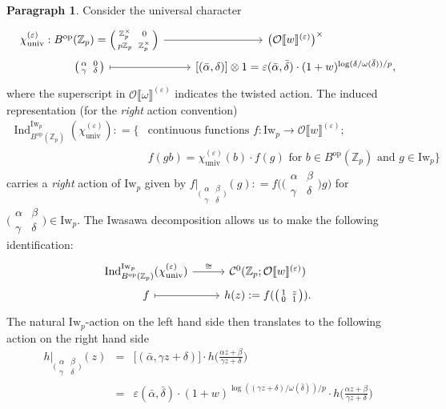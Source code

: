 \documentclass[12pt]{amsart}
\theoremstyle{definition}
\newtheorem{para}[subsection]{Paragraph}
\numberwithin{equation}{subsection}
\def\calC{\mathcal{C}}
\def\calO{\mathcal{O}}
\def\ZZ{\mathbb{Z}}
\newcommand{\op}{\mathrm{op}}
\newcommand{\Iw}{\mathrm{Iw}}
\newcommand{\univ}{\mathrm{univ}}
\DeclareMathOperator{\Ind}{Ind}
\newcommand{\Matrix}[4]{{\big(\begin{smallmatrix}#1&#2\\#3& #4\end{smallmatrix} \big)}}
\begin{document}
\begin{para}
\label{P:para_061}
Consider the universal character
\[
\begin{tikzcd}[row sep = 0pt]
\chi^{(\varepsilon)}_\univ: B^\mathrm{op}(\ZZ_p) ={\Big( \begin{smallmatrix}
\ZZ_p^\times &0  \\p\ZZ_p & \ZZ_p^\times
\end{smallmatrix} \Big)} \ar[r]
&\big( \calO\llbracket w \rrbracket^{(\varepsilon)} \big) ^\times
\\
{\Matrix {\alpha}{0}{\gamma}{\delta}} \ar[r, mapsto] & {[(\bar \alpha, \delta)]} \otimes 1 = \varepsilon(\bar \alpha, \bar \delta) \cdot (1+w)^{\log(\delta/\omega( \bar \delta))/p},
\end{tikzcd}
\]
where the superscript in $\calO\llbracket \omega\rrbracket^{(\varepsilon)}$ indicates the twisted action. The induced representation (for the \emph{right} action convention)
\begin{align*}
\Ind_{B^\op(\ZZ_p)}^{\Iw_p}(\chi_\univ^{(\varepsilon)}): = \big\{ &\textrm{continuous functions }f: \Iw_p \to  \calO\llbracket w\rrbracket^{(\varepsilon)};
\\ & f(gb) = \chi_\univ^{(\varepsilon)}(b) \cdot f(g) \textrm{ for }b \in B^\op(\ZZ_p) \textrm{ and } g \in \Iw_p\big\}
\end{align*}
carries a \emph{right} action of $\Iw_p$ given by $f|_{\Matrix \alpha\beta{\gamma}\delta}(g): = f\big(\Matrix \alpha \beta \gamma \delta g\big)$ 
for $\Matrix \alpha\beta{\gamma}\delta \in \Iw_p$.
The Iwasawa decomposition allows us to make the following identification:
\[
\begin{tikzcd}[row sep =0pt]
\Ind_{B^\op(\ZZ_p)}^{\Iw_p}(\chi_\univ^{(\varepsilon)}) \ar[r, "\cong"]& \calC^0(\ZZ_p; \calO\llbracket w \rrbracket^{(\varepsilon)})
\\
f \ar[r, mapsto] & h(z): = f(\Matrix 1{z}01).
\end{tikzcd}
\] 
The natural $\Iw_p$-action on the left hand side then translates to the following action on the right hand side
\begin{eqnarray}
\label{E:induced representation action}
h\big|_{\Matrix \alpha\beta{\gamma}\delta}(z) & =& \big[(\bar \alpha, \gamma z+\delta)\big] \cdot h\Big( \frac{\alpha z+\beta}{\gamma z+\delta}\Big)
\\
\nonumber
&=& \varepsilon(\bar \alpha, \bar \delta) \cdot (1+w)^{\log\left((\gamma z+\delta )/ \omega(\bar \delta)\right) / p} \cdot h\Big( \frac{\alpha z+\beta}{\gamma z+\delta}\Big)

\end{eqnarray}
\end{para}
\end{document}
